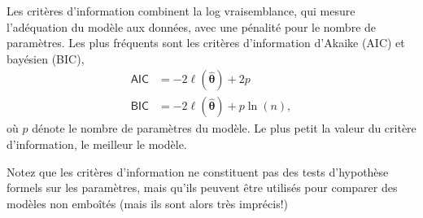 \documentclass[
  11pt,
  letterpaper,
]{scrbook}
\theoremstyle{plain}
\theoremstyle{plain}
\theoremstyle{definition}
\theoremstyle{definition}
\theoremstyle{remark}
\begin{document}
Les critères d'information combinent la log vraisemblance, qui mesure
l'adéquation du modèle aux données, avec une pénalité pour le nombre de
paramètres. Les plus fréquents sont les critères d'information d'Akaike
(AIC) et bayésien (BIC), \begin{align*}
\mathsf{AIC}&=-2\ell(\widehat{\boldsymbol{\theta}})+2p \\
\mathsf{BIC}&=-2\ell(\widehat{\boldsymbol{\theta}})+p\ln(n),
\end{align*} où \(p\) dénote le nombre de paramètres du modèle. Le plus
petit la valeur du critère d'information, le meilleur le modèle.

Notez que les critères d'information ne constituent pas des tests
d'hypothèse formels sur les paramètres, mais qu'ils peuvent être
utilisés pour comparer des modèles non emboîtés (mais ils sont alors
très imprécis!)
\end{document}
